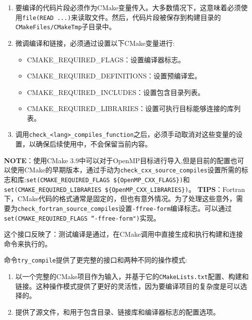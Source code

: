 \begin{enumerate}
\item 要编译的代码片段必须作为CMake变量传入。大多数情况下，这意味着必须使用\texttt{file(READ ...)}来读取文件。然后，代码片段被保存到构建目录的\texttt{CMakeFiles/CMakeTmp}子目录中。

\item 微调编译和链接，必须通过设置以下CMake变量进行:

\begin{itemize}
\item CMAKE\_REQUIRED\_FLAGS：设置编译器标志。

\item CMAKE\_REQUIRED\_DEFINITIONS：设置预编译宏。

\item CMAKE\_REQUIRED\_INCLUDES：设置包含目录列表。

\item CMAKE\_REQUIRED\_LIBRARIES：设置可执行目标能够连接的库列表。

\end{itemize}

\item 调用\texttt{check\_<lang>\_compiles\_function}之后，必须手动取消对这些变量的设置，以确保后续使用中，不会保留当前内容。

\end{enumerate}

\begin{myInfoBox}
\textbf{NOTE}：使用CMake 3.9中可以对于OpenMP目标进行导入,但是目前的配置也可以使用CMake的早期版本，通过手动为\texttt{check\_cxx\_source\_compiles}设置所需的标志和库:\texttt{set(CMAKE\_REQUIRED\_FLAGS \$\{OpenMP\_CXX\_FLAGS\})}和\texttt{set(CMAKE\_REQUIRED\_LIBRARIES \$\{OpenMP\_CXX\_LIBRARIES\})}。 \textbf{TIPS}：Fortran下，CMake代码的格式通常是固定的，但也有意外情况。为了处理这些意外，需要为\texttt{check\_fortran\_source\_compiles}设置\texttt{-ffree-form}编译标志。可以通过\texttt{set(CMAKE\_REQUIRED\_FLAGS “-ffree-form")}实现。
\end{myInfoBox}

这个接口反映了：测试编译是通过，在CMake调用中直接生成和执行构建和连接命令来执行的。

命令\texttt{try\_compile}提供了更完整的接口和两种不同的操作模式:

\begin{enumerate}
\item 以一个完整的CMake项目作为输入，并基于它的\texttt{CMakeLists.txt}配置、构建和链接。这种操作模式提供了更好的灵活性，因为要编译项目的复杂度是可以选择的。

\item 提供了源文件，和用于包含目录、链接库和编译器标志的配置选项。

\end{enumerate}


